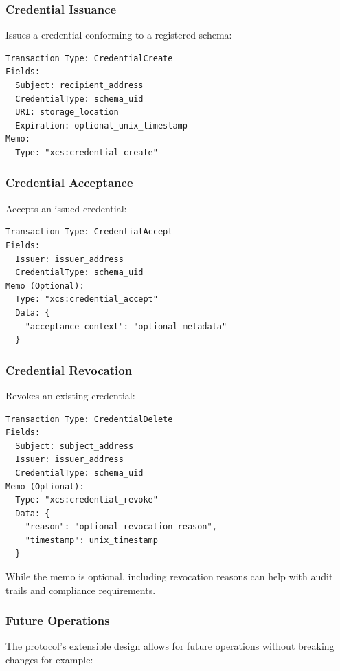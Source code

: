 \documentclass[11pt,a4paper]{article}
\begin{document}
\subsubsection{Credential Issuance}

Issues a credential conforming to a registered schema:

\begin{lstlisting}[caption={Credential Creation}]
Transaction Type: CredentialCreate
Fields:
  Subject: recipient_address
  CredentialType: schema_uid
  URI: storage_location
  Expiration: optional_unix_timestamp
Memo:
  Type: "xcs:credential_create"
\end{lstlisting}


\subsubsection{Credential Acceptance}

Accepts an issued credential:

\begin{lstlisting}[caption={Credential Acceptance}]
Transaction Type: CredentialAccept
Fields:
  Issuer: issuer_address
  CredentialType: schema_uid
Memo (Optional):
  Type: "xcs:credential_accept"
  Data: {
    "acceptance_context": "optional_metadata"
  }
\end{lstlisting}

\subsubsection{Credential Revocation}

Revokes an existing credential:

\begin{lstlisting}[caption={Credential Deletion}]
Transaction Type: CredentialDelete
Fields:
  Subject: subject_address
  Issuer: issuer_address
  CredentialType: schema_uid
Memo (Optional):
  Type: "xcs:credential_revoke"
  Data: {
    "reason": "optional_revocation_reason",
    "timestamp": unix_timestamp
  }
\end{lstlisting}

While the memo is optional, including revocation reasons can help with audit trails and compliance requirements.

\subsubsection{Future Operations}

The protocol's extensible design allows for future operations without breaking changes for example:
\end{document}
